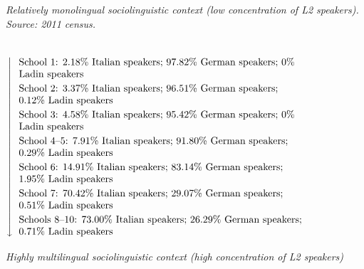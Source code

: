 \documentclass[varwidth]{standalone}
\begin{document}
	\parbox{10cm}{\raggedright\textit{Relatively monolingual sociolinguistic context (low concentration of L2 speakers). Source: 2011 census.}}\\
	$
	\left\downarrow {\def\arraystretch{1.2}\begin{tabular}{>{\raggedright\arraybackslash}p{10cm}}
			School 1: 2.18\% Italian speakers; 97.82\% German speakers; 0\% Ladin speakers\\
			School 2: 3.37\% Italian speakers; 96.51\% German speakers; 0.12\% Ladin speakers \\
			School 3: 4.58\% Italian speakers; 95.42\% German speakers; 0\% Ladin speakers \\
			School 4--5: 7.91\% Italian speakers; 91.80\% German speakers; 0.29\% Ladin speakers\\ 
			School 6: 14.91\% Italian speakers; 83.14\% German speakers; 1.95\% Ladin speakers \\
			School 7: 70.42\% Italian speakers; 29.07\% German  speakers; 0.51\% Ladin speakers\\
			Schools 8--10: 73.00\% Italian speakers; 26.29\% German speakers; 0.71\% Ladin speakers
	\end{tabular}}\right.
	$\\
	\parbox{10cm}{\raggedright\textit{Highly multilingual sociolinguistic context (high concentration of L2 speakers)}}
\end{document}
